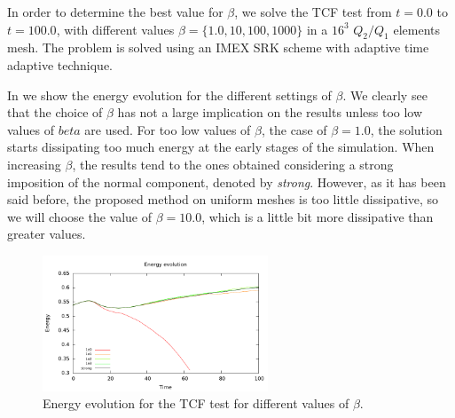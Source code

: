 In order to determine the best value for $ \beta $, we solve the TCF test from $ t=0.0 $ to $ t=100.0 $, with different values $ \beta=\{1.0,10,100,1000\} $ in a $ 16^3 $ $ Q_2/Q_1 $ elements mesh. The problem is solved using an IMEX SRK scheme with adaptive time adaptive technique.

In  we show the energy evolution for the different settings of $ \beta $. We clearly see that the choice of $ \beta $ has not a large implication on the results unless too low values of $ beta $ are used. For too low values of $ \beta $, the case of $ \beta=1.0 $, the solution starts dissipating too much energy at the early stages of the simulation. When increasing $ \beta $, the results tend to the ones obtained considering a strong imposition of the normal component, denoted by \textit{strong}. However, as it has been said before, the proposed method on uniform meshes is too little dissipative, so we will choose the value of $ \beta=10.0 $, which is a little bit more dissipative than greater values.
\begin{figure}[h!]
  \centering
  \includegraphics[width=0.6\textwidth]{Figures/Chapter7/TCF/ene_beta}
  \caption{Energy evolution for the TCF test for different values of $ \beta $.}
  \label{fig-TCF_ene_beta}
\end{figure}
%
%
%
